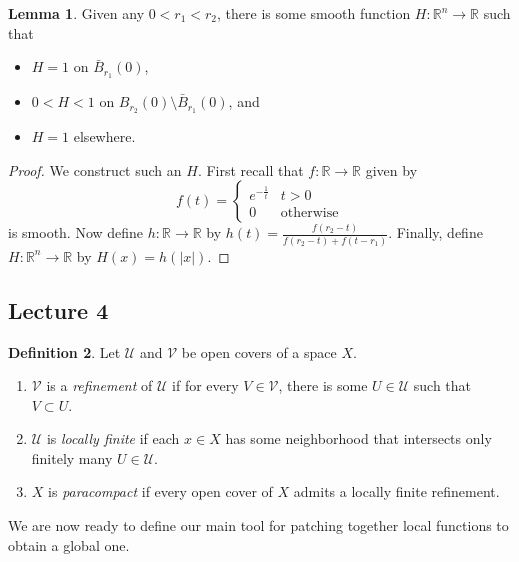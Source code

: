 \documentclass[10pt,letterpaper,cm]{nupset}
\theoremstyle{definition}
\newtheorem{definition}{Definition}[subsection]
\theoremstyle{theorem}
\newtheorem{lemma}[definition]{Lemma}
\theoremstyle{remark}
\newcommand{\R}{\mathbb R}
\newcommand{\1}{\mathbf{1}}
\newcommand{\0}{\vec 0}
\begin{document}
\begin{lemma}\label{l5}
Given any $0<r_1<r_2$, there is some smooth function $H: \R^n \to \R$ such that 
\begin{itemize}
\item $H =1$ on $\bar{B}_{r_1}(0)$, 
\item $0<H <1$ on $B_{r_2}(0)\setminus \bar{B}_{r_1}(0)$, and
\item $H=1$ elsewhere. 
\end{itemize}
\end{lemma}
\begin{proof}
We construct such an $H$. First recall that $f: \R \to \R$ given by 
\[
f(t) = \begin{cases}
e^{-\frac{1}{t}} & t>0
\\ 0 & \text{otherwise}
\end{cases}
\] is smooth. Now define $h: \R \to \R$ by $h(t) = \frac{f(r_2-t)}{f(r_2-t)+ f(t-r_1)}$. Finally, define $H: \R^n \to \R$ by $H(x) = h(\left\lvert{x}\right\rvert)$.
\end{proof}

\subsection{Lecture 4}



\begin{definition}
Let $\mathcal{U}$ and $\mathcal{V}$ be open covers of a space $X$.
\begin{enumerate}
\item  $\mathcal{V}$ is a \textit{refinement} of $\mathcal{U}$ if for every $V\in \mathcal{V}$, there is some $U \in \mathcal{U}$ such that $V \subset U$.
\item $\mathcal{U}$ is \textit{locally finite} if each $x\in X$ has some neighborhood that intersects only finitely many $U \in \mathcal{U}$. 
\item $X$ is \textit{paracompact} if every open cover of $X$ admits a locally finite refinement.
\end{enumerate}
\end{definition}

\smallskip

We are now ready to define our main tool for patching together local functions to obtain a global one.
\end{document}
